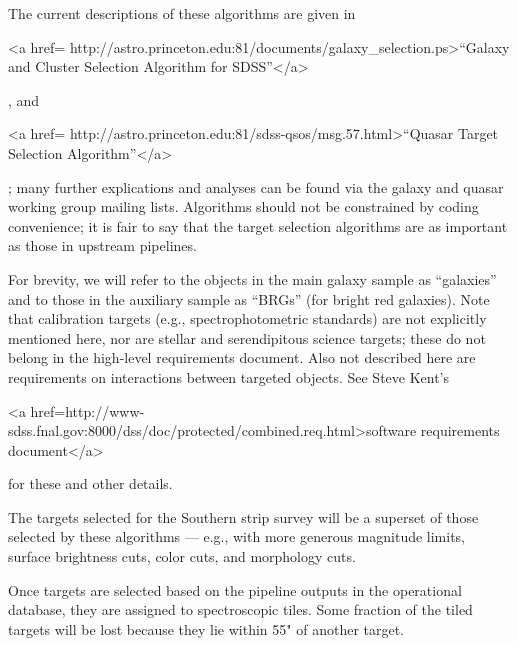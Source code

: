 The current descriptions of these algorithms are given in
\begin{rawhtml}
<a href=
 http://astro.princeton.edu:81/documents/galaxy_selection.ps>``Galaxy and Cluster Selection Algorithm for
SDSS''</a>\end{rawhtml}, 
and 
\begin{rawhtml}
<a href=
 http://astro.princeton.edu:81/sdss-qsos/msg.57.html>``Quasar Target
Selection Algorithm''</a>
\end{rawhtml}; 
many further explications and analyses can be found via the
galaxy and quasar working group mailing lists.  Algorithms should not
be constrained by coding convenience; it is fair to say that the
target selection algorithms are as important as those in upstream
pipelines. 


For brevity, we will refer to the objects in the main galaxy sample
as ``galaxies'' and to those in the auxiliary sample as ``BRGs''
(for bright red galaxies).
Note that calibration targets (e.g., spectrophotometric standards)
are not explicitly mentioned here, nor are stellar and
serendipitous science targets; these do not belong in the high-level
requirements document.   Also not described here are requirements on
interactions between targeted objects.  See Steve Kent's 
\begin{rawhtml}
<a href=http://www-sdss.fnal.gov:8000/dss/doc/protected/combined.req.html>software
requirements
document</a>\end{rawhtml}
for these and other details. 

The targets selected for the Southern strip survey will be a superset
of those selected by these algorithms --- e.g., with more generous
magnitude limits, surface brightness cuts, color cuts, and morphology
cuts.

Once targets are selected based on the pipeline outputs in the operational
database, they are assigned to spectroscopic tiles.  Some fraction of the
tiled targets will be lost because they lie within 55" of another target.


